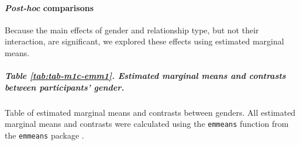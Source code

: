 \documentclass[
  bookmarksnumbered]{article}
\begin{document}
\begin{table}[H]
\centering
\caption{\label{tab:tab-m1c}Effects of relationship type and gender on Dyadic TSD Partner}
\centering
{}
\end{table}

\paragraph{\texorpdfstring{\emph{Post-hoc} comparisons}{Post-hoc comparisons}}\label{post-hoc-comparisons-2}

Because the main effects of gender and relationship type, but not their interaction, are significant, we explored these effects using estimated marginal means.

\subparagraph{Table \ref{tab:tab-m1c-emm1}. Estimated marginal means and contrasts between participants' gender.}\label{table-reftabtab-m1c-emm1.-estimated-marginal-means-and-contrasts-between-participants-gender.}

Table of estimated marginal means and contrasts between genders. All estimated marginal means and contrasts were calculated using the \texttt{emmeans} function from the \texttt{emmeans} package \autocite{emmeanscit}.
\end{document}
